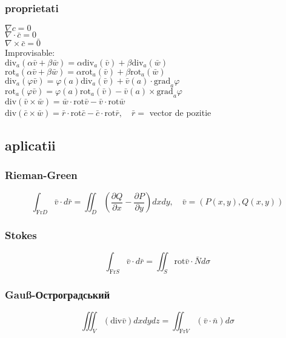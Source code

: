 \documentclass{article}
\newcommand{\parti}[2]{\frac{\partial #1}{ \partial #2}}
\newcommand*{\grad}{\mathrm{grad}}
\renewcommand*{\div}{\mathrm{div}}
\newcommand*{\rot}{\mathrm{rot}}
\newcommand*{\Fr}{\mathrm{Fr}}
\begin{document}
\subsubsection*{proprietati}
$\nabla c = 0$\\
$\nabla \cdot \bar{c} = 0$\\
$\nabla \times \bar{c} = \bar 0$\\
Improvisable:\\
$\div_a(\alpha \bar{v} + \beta \bar{w}) = \alpha \div_a(\bar v) + \beta \div_a(\bar w)$\\
$\rot_a(\alpha \bar{v} + \beta \bar{w}) = \alpha \rot_a(\bar v) + \beta \rot_a(\bar w)$\\
$\div_a(\varphi \bar v) = \varphi(a) \div_a(\bar v) + \bar v (a) \cdot \grad_a \varphi$\\
$\rot_a(\varphi \bar v) = \varphi(a) \rot_a(\bar v) - \bar v (a) \times \grad_a \varphi$\\
$\div(\bar v \times \bar w)= \bar w \cdot \rot \bar v - \bar v \cdot \rot \bar w$\\
$\div(\bar c \times \bar w)= \bar r \cdot \rot \bar c - \bar c \cdot \rot \bar r, \quad \bar r = $ vector de pozitie \\
\subsection*{aplicatii}
\subsubsection*{Rieman-Green}
\[ \int_{\Fr D} \bar v \cdot d\bar{r} = \iint_D \left( \parti{Q}{x} - \parti{P}{y} \right) dx dy, \quad \bar{v} = (P(x,y), Q(x,y)) \]
\subsubsection*{Stokes}
\[ \int_{\Fr S} \bar v \cdot d \bar r = \iint_S \rot \bar v \cdot \bar N d \sigma \]
\subsubsection*{Gauß-Остроградський}
\[\iiint_V (\div \bar v) dx dy dz = \iint_{\Fr V} (\bar v \cdot \bar n) d\sigma \]
\end{document}
